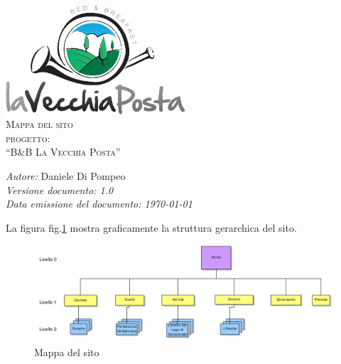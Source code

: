 \documentclass[a4paper,12pt,hidelinks]{report}
\begin{document}
  \begin{titlepage}
    \begin{center}
      \includegraphics[width=0.5\textwidth,keepaspectratio=true]{../../img/logo}\\[1cm]    
      \textsc{\LARGE Mappa del sito}\\[0.6cm]
      \textsc{\LARGE  progetto:\\[0.5cm] ``B\&B La Vecchia Posta''}\\ [2.0cm]

      \begin{minipage}{0.8\textwidth}
	\begin{flushleft} \large
	  \emph{Autore:} Daniele Di Pompeo \\[0.5cm]
	  \emph{Versione documento: 1.0}\\[0.5cm]
	  \emph{Data emissione del documento: \today}\\[0.5cm]
	\end{flushleft}
      \end{minipage}
    \end{center}
  \end{titlepage}

La figura fig.\ref{fig:sitemap} mostra graficamente la struttura gerarchica del sito. 
\begin{figure}[h!]%
    \includegraphics[width=1\textwidth,keepaspectratio=true]{../../img/sitemap}
    \centering
    \caption{Mappa del sito}%
    \label{fig:sitemap}%
\end{figure}
\end{document}
